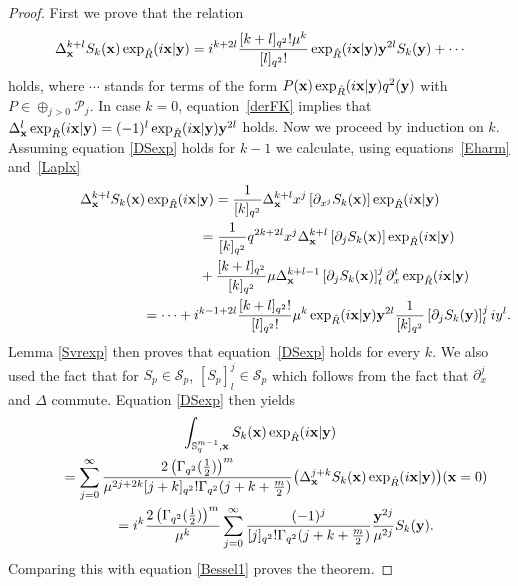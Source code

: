 \documentclass[pdftex]{sigma}
\newcommand{\mS}{\mathbb{S}}
\newcommand{\cP}{\mathcal{P}}
\newcommand{\cS}{\mathcal{S}}
\numberwithin{equation}{section}
\begin{document}
\begin{proof}
First we prove that the relation
\begin{gather}
\label{DSexp}
\Delta_{\bold{x}}^{k+l}S_k(\bold{x})\exp_{\hat{R}}(i\bold{x}|\bold{y})
=i^{k+2l}\frac{[k+l]_{q^2}!\mu^k}{[l]_{q^2}!}\exp_{\hat{R}}(i\bold{x}|\bold{y})\bold{y}^{2l}S_k(\bold{y})+\cdots
\end{gather}
holds, where $\cdots$ stands for terms of the form $P(\bold{x})\exp_{\hat{R}}(i\bold{x}|\bold{y})q^2(\bold{y})$ with $P\in\oplus_{j>0}\cP_j$. In case $k=0$, equation~\eqref{derFK} implies that $\Delta_{\bold{x}}^{l}\exp_{\hat{R}}(i\bold{x}|\bold{y})=(-1)^l\exp_{\hat{R}}(i\bold{x}|\bold{y})\bold{y}^{2l}$ holds. Now we proceed by induction on $k$. Assuming equation \eqref{DSexp} holds for $k-1$ we calculate, using equations~\eqref{Eharm} and~\eqref{Laplx}
\begin{gather*}
\Delta_{\bold{x}}^{k+l}S_k(\bold{x})\exp_{\hat{R}}(i\bold{x}|\bold{y})
= \frac{1}{[k]_{q^2}}\Delta_{\bold{x}}^{k+l}x^j\left[\partial_{x^j}S_k(\bold{x})\right]\exp_{\hat{R}}(i\bold{x}|\bold{y})\\
\phantom{\Delta_{\bold{x}}^{k+l}S_k(\bold{x})\exp_{\hat{R}}(i\bold{x}|\bold{y})}{}
=\frac{1}{[k]_{q^2}}q^{2k+2l}x^j\Delta_{\bold{x}}^{k+l}\left[\partial_{j}S_k(\bold{x})\right]\exp_{\hat{R}}(i\bold{x}|\bold{y})\\
\phantom{\Delta_{\bold{x}}^{k+l}S_k(\bold{x})\exp_{\hat{R}}(i\bold{x}|\bold{y})=}{}
+\frac{[k+l]_{q^2}}{[k]_{q^2}}\mu\Delta_{\bold{x}}^{k+l-1}\left[\partial_{j}S_k(\bold{x})\right]^j_t\partial_{x}^t\exp_{\hat{R}}(i\bold{x}|\bold{y})\\
\phantom{\Delta_{\bold{x}}^{k+l}S_k(\bold{x})\exp_{\hat{R}}(i\bold{x}|\bold{y})}{}
=\cdots+i^{k-1+2l}\frac{[k+l]_{q^2}!}{[l]_{q^2}!}\mu^{k}\exp_{\hat{R}}(i\bold{x}|\bold{y})\bold{y}^{2l}\frac{1}{[k]_{q^2}}\left[\partial_{j}S_k(\bold{y})\right]^j_liy^l.
\end{gather*}
Lemma \ref{Svrexp} then proves that equation~\eqref{DSexp} holds for every $k$. We also used the fact that for $S_p\in\cS_p$, $[S_p]^j_l\in\cS_p$ which follows from the fact that $\partial_x^j$ and $\Delta$ commute. Equation \eqref{DSexp} then yields
\begin{gather*}
\int_{\mS^{m-1}_q,\bold{x}}S_k(\bold{x})\exp_{\hat{R}}(i\bold{x}|\bold{y})\\
 \qquad{} = \sum_{j=0}^\infty\frac{2\left(\Gamma_{q^2}(\frac{1}{2})\right)^{m}}{\mu^{2j+2k}[j+k]_{q^2}!
\Gamma_{q^2}(j+k+\frac{m}{2})}\big(\Delta^{j+k}_{\bold{x}}S_k(\bold{x})\exp_{\hat{R}}(i\bold{x}|\bold{y})\big)(\bold{x}=0)\\
 \qquad{} = i^{k}\frac{2\left(\Gamma_{q^2}(\frac{1}{2})\right)^{m}}{\mu^k}
 \sum_{j=0}^\infty\frac{(-1)^j}{[j]_{q^2}!\Gamma_{q^2}(j+k+\frac{m}{2})}\frac{\bold{y}^{2j}}{\mu^{2j}}S_k(\bold{y}).
\end{gather*}
Comparing this with equation \eqref{Bessel1} proves the theorem.
\end{proof}
\end{document}

